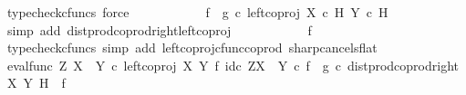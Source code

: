 \begin{isabellebody}
\ {\isacharparenleft}{\kern0pt}typecheck{\isacharunderscore}{\kern0pt}cfuncs{\isacharcomma}{\kern0pt}\ force{\isacharparenright}{\kern0pt}\isanewline
\ \ \ \ \ \ \isamarkupfalse%
\ \isamarkupfalse%
\ {\isachardoublequoteopen}{\isachardot}{\kern0pt}{\isachardot}{\kern0pt}{\isachardot}{\kern0pt}\ {\isacharequal}{\kern0pt}\ {\isacharparenleft}{\kern0pt}f\isactrlsup {\isasymflat}\ {\isasymamalg}\ g\isactrlsup {\isasymflat}\ {\isasymcirc}\isactrlsub c\ left{\isacharunderscore}{\kern0pt}coproj\ {\isacharparenleft}{\kern0pt}X\ {\isasymtimes}\isactrlsub c\ H{\isacharparenright}{\kern0pt}\ {\isacharparenleft}{\kern0pt}Y\ {\isasymtimes}\isactrlsub c\ H{\isacharparenright}{\kern0pt}{\isacharparenright}{\kern0pt}\isactrlsup {\isasymsharp}{\isachardoublequoteclose}\isanewline
\ \ \ \ \ \ \ \ \isamarkupfalse%
\ {\isacharparenleft}{\kern0pt}simp\ add{\isacharcolon}{\kern0pt}\ dist{\isacharunderscore}{\kern0pt}prod{\isacharunderscore}{\kern0pt}coprod{\isacharunderscore}{\kern0pt}right{\isacharunderscore}{\kern0pt}left{\isacharunderscore}{\kern0pt}coproj{\isacharparenright}{\kern0pt}\isanewline
\ \ \ \ \ \ \isamarkupfalse%
\ \isamarkupfalse%
\ {\isachardoublequoteopen}{\isachardot}{\kern0pt}{\isachardot}{\kern0pt}{\isachardot}{\kern0pt}\ {\isacharequal}{\kern0pt}\ f{\isachardoublequoteclose}\isanewline
\ \ \ \ \ \ \ \ \isamarkupfalse%
\ {\isacharparenleft}{\kern0pt}typecheck{\isacharunderscore}{\kern0pt}cfuncs{\isacharcomma}{\kern0pt}\ simp\ add{\isacharcolon}{\kern0pt}\ left{\isacharunderscore}{\kern0pt}coproj{\isacharunderscore}{\kern0pt}cfunc{\isacharunderscore}{\kern0pt}coprod\ sharp{\isacharunderscore}{\kern0pt}cancels{\isacharunderscore}{\kern0pt}flat{\isacharparenright}{\kern0pt}\isanewline
\ \ \ \ \ \ \isamarkupfalse%
\ \isamarkupfalse%
\ {\isachardoublequoteopen}{\isacharparenleft}{\kern0pt}eval{\isacharunderscore}{\kern0pt}func\ Z\ {\isacharparenleft}{\kern0pt}X\ {\isasymCoprod}\ Y{\isacharparenright}{\kern0pt}\ {\isasymcirc}\isactrlsub c\ left{\isacharunderscore}{\kern0pt}coproj\ X\ Y\ {\isasymtimes}\isactrlsub f\ id\isactrlsub c\ {\isacharparenleft}{\kern0pt}Z\isactrlbsup {\isacharparenleft}{\kern0pt}X\ {\isasymCoprod}\ Y{\isacharparenright}{\kern0pt}\isactrlesup {\isacharparenright}{\kern0pt}{\isacharparenright}{\kern0pt}\isactrlsup {\isasymsharp}\ {\isasymcirc}\isactrlsub c\ {\isacharparenleft}{\kern0pt}f\isactrlsup {\isasymflat}\ {\isasymamalg}\ g\isactrlsup {\isasymflat}\ {\isasymcirc}\isactrlsub c\ dist{\isacharunderscore}{\kern0pt}prod{\isacharunderscore}{\kern0pt}coprod{\isacharunderscore}{\kern0pt}right\ X\ Y\ H{\isacharparenright}{\kern0pt}\isactrlsup {\isasymsharp}\ {\isacharequal}{\kern0pt}\ f{\isachardoublequoteclose}\isacommand{{\isachardot}{\kern0pt}}\isamarkupfalse%

\end{isabellebody}
